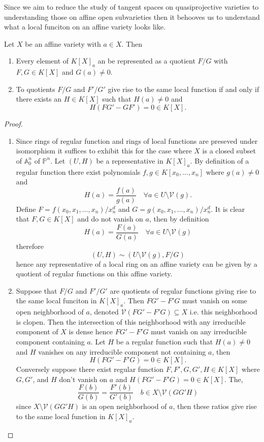 \documentclass[40pt]{article}
\newcommand{\Proj}{\mathbb{P}}
\newcommand{\A}{\mathbb{A}}
\newcommand{\V}{\mathcal{V}}
\theoremstyle{remark}
\begin{document}
		Since we aim to reduce the study of tangent spaces on quasiprojective varieties to understanding those on affine open subvarieties then it behooves us to understand what a local funciton on an affine variety looks like. 
		\begin{prop}
			Let $X$ be an affine variety with $a \in X$. Then
			\begin{enumerate}
				\item Every element of $K[X]_a$ an be represented as a quotient $F/G$ with $F,G \in K[X]$ and $G(a)\neq 0$.
				\item To quotients $F/G$ and $F'/G'$ give rise to the same local function if and only if there exists an $H \in K[X]$ such that $H(a)\neq0$ and 
				\[
				H(FG'-GF') = 0 \in K[X].
				\]
			\end{enumerate}
		\end{prop}
		\begin{proof}
			\begin{enumerate}
				\item Since rings of regular function and rings of local functions are preseved under isomorphism it suffices to exhibit this for the case where $X$ is a closed subset of $\A^n_0$ of $\Proj^n$. Let $(U,H)$ be a representative in $K[X]_a$. By definition of a regular function there exist polynomials $f,g \in K[x_0,\dots,x_n]$ where $g(a) \neq 0$ and 
				\[
				H(a) = \frac{f(a)}{g(a)} \quad \forall a \in U\setminus \V(g).
				\]
				Define $F = f(x_0,x_1,\dots,x_n)/x_n^d$ and $G = g(x_0,x_1,\dots,x_n)/x_n^d$. It is clear that $F,G \in K[X]$ and do not vanish on $a$, then by definition 
				\[
				H(a) = \frac{F(a)}{G(a)} \quad \forall a \in U \setminus \V(g)
				\]
				therefore 
				\[
				(U,H) \sim (U \setminus \V(g), F/G)
				\]
				hence any representative of a local ring on an affine variety can be given by a quotient of regular functions on this affine variety. 
				\item Suppose that $F/G$ and $F'/G'$ are quotients of regular functions giving rise to the same local funciton in $K[X]_a$. Then $FG' - F'G$ must vanish on some open neighborhood of  $a$, denoted $\V(FG'-F'G) \subseteq X$ i.e. this neighborhood is clopen. Then the intersection of this neighborhood with any irreducible component of $X$ is dense hence $FG' - F'G$ must vanish on any irreducible component containing $a$. Let $H$ be a regular function such that $H(a) \neq 0$ and $H$ vanishes on any irreducible component not containing $a$, then 
				\[
				H(FG' - F'G) = 0 \in K[X].
				\]
				Conversely suppose there exist regular function $F,F',G,G',H \in K[X]$ where $G,G'$, and $H$ don't vanish on $a$ and $H(FG' - F'G) = 0 \in K[X]$. The, 
				\[
				\frac{F(b)}{G(b)} = \frac{F'(b)}{G'(b)} \quad b \in X \setminus \V(GG'H)
				\]
				since $X \setminus \V(GG'H)$ is an open neighborhood of $a$, then these ratios give rise to the same local function in $K[X]_a$. 
			\end{enumerate}
		\end{proof}
\end{document}
